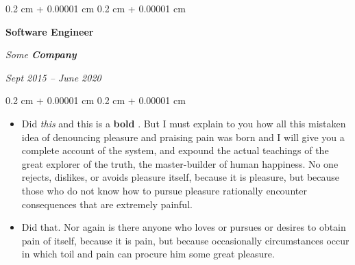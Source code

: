 \documentclass[10pt, letterpaper]{article}
\newenvironment{highlights}{
    \begin{itemize}[
        topsep=0.10 cm,
        parsep=0.10 cm,
        partopsep=0pt,
        itemsep=0pt,
        leftmargin=0.4 cm + 10pt
    ]
}{
    \end{itemize}
} %
\newenvironment{onecolentry}{
    \begin{adjustwidth}{
        0.2 cm + 0.00001 cm
    }{
        0.2 cm + 0.00001 cm
    }
}{
    \end{adjustwidth}
} %
\newenvironment{twocolentry}[2][]{
    \onecolentry
    \def\secondColumn{#2}
    \setcolumnwidth{\fill, 4.5 cm}
    \begin{paracol}{2}
}{
    \switchcolumn \raggedleft \secondColumn
    \end{paracol}
    \endonecolentry
} %
\let\hrefWithoutArrow\href
\renewcommand{\href}[2]{\hrefWithoutArrow{#1}{\ifthenelse{\equal{#2}{}}{ }{#2 }\raisebox{.15ex}{\footnotesize \faExternalLink*}}}
\begin{document}
        \vspace{0.2 cm}

        \begin{twocolentry}{
            
            
        \textit{Sept 2015 – June 2020}}
            \textbf{Software Engineer}
            
            \textit{Some \textbf{Company}}
        \end{twocolentry}
        \vspace{0.10 cm}
        \begin{onecolentry}
            \begin{highlights}
                \item Did \textit{this} and this is a \textbf{bold} \href{https://example.com}{link}. But I must explain to you how all this mistaken idea of denouncing pleasure and praising pain was born and I will give you a complete account of the system, and expound the actual teachings of the great explorer of the truth, the master-builder of human happiness. No one rejects, dislikes, or avoids pleasure itself, because it is pleasure, but because those who do not know how to pursue pleasure rationally encounter consequences that are extremely painful.
                \item Did that. Nor again is there anyone who loves or pursues or desires to obtain pain of itself, because it is pain, but because occasionally circumstances occur in which toil and pain can procure him some great pleasure.
            \end{highlights}
        \end{onecolentry}


        \vspace{0.2 cm}
\end{document}
